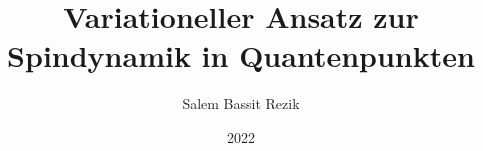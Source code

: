 \documentclass[
  tucolor,       %
  BCOR=12mm,     %
  parskip=half,  %
  open=any,      %
  cleardoublepage=plain,  %
]{tudothesis}
\author{Salem Bassit Rezik}
\title{Variationeller Ansatz zur Spindynamik in Quantenpunkten}
\date{2022}
\begin{document}
\frontmatter
%
\maketitle

\makecorrectorpage


\tableofcontents

\mainmatter







\appendix
%

\backmatter
\printbibliography

\cleardoublepage

\end{document}
